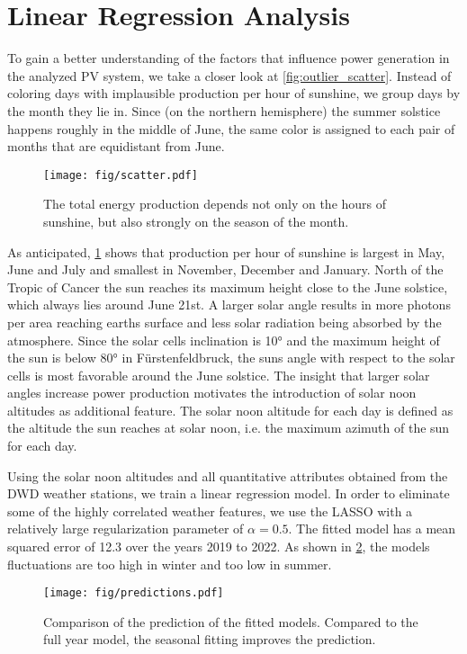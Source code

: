 \documentclass{article}
\begin{document}
\section{Linear Regression Analysis}
To gain a better understanding of the factors that influence power generation in the analyzed PV system, we take a closer look at \ref{fig:outlier_scatter}. Instead of coloring days with implausible production per hour of sunshine, we group days by the month they lie in. Since (on the northern hemisphere) the summer solstice happens roughly in the middle of June, the same color is assigned to each pair of months that are equidistant from June.

\begin{figure}[H]
	\texttt{[image: fig/scatter.pdf]}
	\caption{The total energy production depends not only on the hours of sunshine, but also strongly on the season of the month.}\label{fig:scatter_months}
\end{figure}

As anticipated, \ref{fig:scatter_months} shows that production per hour of sunshine is largest in May, June and July and smallest in November, December and January. North of the Tropic of Cancer the sun reaches its maximum height close to the June solstice, which always lies around June 21st. A larger solar angle results in more photons per area reaching earths surface and less solar radiation being absorbed by the atmosphere. Since the solar cells inclination is 10° and the maximum height of the sun is below 80° in Fürstenfeldbruck, the suns angle with respect to the solar cells is most favorable around the June solstice. The insight that larger solar angles increase power production motivates the introduction of solar noon altitudes as additional feature. The solar noon altitude for each day is defined as the altitude the sun reaches at solar noon, i.e. the maximum azimuth of the sun for each day.

Using the solar noon altitudes and all quantitative attributes obtained from the DWD weather stations, we train a linear regression model. In order to eliminate some of the highly correlated weather features, we use the LASSO with a relatively large regularization parameter of $\alpha = 0.5$. The fitted model has a mean squared error of 12.3 over the years 2019 to 2022. As shown in \ref{fig:predictions}, the models fluctuations are too high in winter and too low in summer.

\begin{figure}[H]
	\texttt{[image: fig/predictions.pdf]}
	\caption{Comparison of the prediction of the fitted models. Compared to the full year model, the seasonal fitting improves the prediction.}\label{fig:predictions}
\end{figure}
\end{document}
